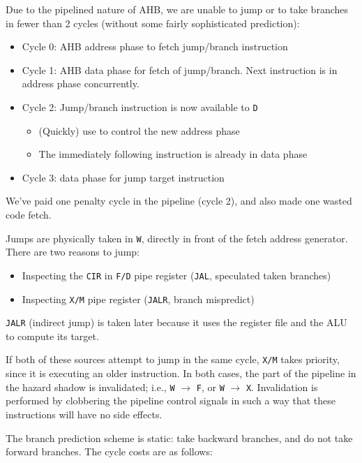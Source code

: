 \documentclass{article}
\begin{document}
Due to the pipelined nature of AHB, we are unable to jump or to take branches in fewer than 2 cycles (without some fairly sophisticated prediction):

\begin{itemize}
\item Cycle 0: AHB address phase to fetch jump/branch instruction
\item Cycle 1: AHB data phase for fetch of jump/branch. Next instruction is in address phase concurrently.
\item Cycle 2: Jump/branch instruction is now available to \texttt{D}
	\begin{itemize}
		\item (Quickly) use to control the new address phase
		\item The immediately following instruction is already in data phase
	\end{itemize}
\item Cycle 3: data phase for jump target instruction
\end{itemize}


We've paid one penalty cycle in the pipeline (cycle 2), and also made one wasted code fetch.

Jumps are physically taken in \texttt{W}, directly in front of the fetch address generator. There are two reasons to jump:

\begin{itemize}
	\item Inspecting the \texttt{CIR} in \texttt{F/D} pipe register (\texttt{JAL}, speculated taken branches)
	\item Inspecting \texttt{X/M} pipe register (\texttt{JALR}, branch mispredict)
\end{itemize}

\texttt{JALR} (indirect jump) is taken later because it uses the register file and the ALU to compute its target.

If both of these sources attempt to jump in the same cycle, \texttt{X/M} takes priority, since it is executing an older instruction. In both cases, the part of the pipeline in the hazard shadow is invalidated; i.e., \texttt{W} $\to$ \texttt{F}, or \texttt{W} $\to$ \texttt{X}. Invalidation is performed by clobbering the pipeline control signals in such a way that these instructions will have no side effects.

The branch prediction scheme is static: take backward branches, and do not take forward branches. The cycle costs are as follows:
\end{document}
